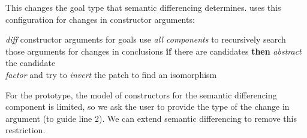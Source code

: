 

This changes the goal type that semantic differencing determines.
\sysname uses this configuration for changes in constructor arguments:

\begin{algorithm}
\footnotesize
\begin{algorithmic}[1]
    \STATE \textit{diff} constructor arguments for goals
    \STATE use \textit{all components} to recursively search those arguments for changes in conclusions
    \STATE \textbf{if} there are candidates \textbf{then}
    \STATE \hspace*{1em} \textit{abstract} the candidate \\
           \hspace*{1em} \textit{factor} and try to \textit{invert} the patch to find an isomorphism
\end{algorithmic}
\end{algorithm}

For the prototype, the model of constructors for the semantic differencing component is limited,
so we ask the user to provide the type of the change in argument (to guide line 2).
We can extend semantic differencing to remove this restriction.





